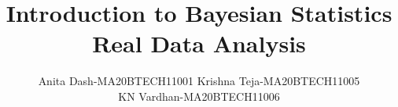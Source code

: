 \documentclass[journal,12pt,twocolumn]{IEEEtran}
\begin{document}

\def\putbox#1#2#3{\makebox[0in][l]{\makebox[#1][l]{}\raisebox{\baselineskip}[0in][0in]{\raisebox{#2}[0in][0in]{#3}}}}
     \def\rightbox#1{\makebox[0in][r]{#1}}
     \def\centbox#1{\makebox[0in]{#1}}
     \def\topbox#1{\raisebox{-\baselineskip}[0in][0in]{#1}}
     \def\midbox#1{\raisebox{-0.5\baselineskip}[0in][0in]{#1}}

\vspace{3cm}

\title{ 
Introduction to Bayesian Statistics\\
Real Data Analysis
}

%
%
%

\author{ Anita Dash-MA20BTECH11001 \quad
Krishna Teja-MA20BTECH11005 \\
KN Vardhan-MA20BTECH11006 }

% 
%
\end{document}
